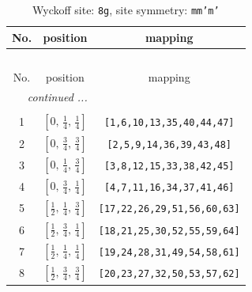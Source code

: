 \documentclass[fleqn,8pt]{jsarticle}
\begin{document}
\begin{longtable}{ccc}
\caption{Wyckoff site: {\tt 8g}, site symmetry: {\tt mm'm'}}
 \\
 \hline \hline
No. & position & mapping \\ \hline \endfirsthead

\multicolumn{2}{l}{\tablename\ \thetable{}} \\
 \hline \hline
No. & position & mapping \\ \hline \endhead

 \hline \hline
\multicolumn{2}{r}{\footnotesize\it continued ...} \\ \endfoot

 \hline \hline
\multicolumn{2}{r}{} \\ \endlastfoot

1 & $\left[ 0,\, \frac{1}{4},\, \frac{1}{4} \right]$ & {\tt [1,6,10,13,35,40,44,47]} \\ \hline
2 & $\left[ 0,\, \frac{3}{4},\, \frac{3}{4} \right]$ & {\tt [2,5,9,14,36,39,43,48]} \\ \hline
3 & $\left[ 0,\, \frac{1}{4},\, \frac{3}{4} \right]$ & {\tt [3,8,12,15,33,38,42,45]} \\ \hline
4 & $\left[ 0,\, \frac{3}{4},\, \frac{1}{4} \right]$ & {\tt [4,7,11,16,34,37,41,46]} \\ \hline
5 & $\left[ \frac{1}{2},\, \frac{1}{4},\, \frac{3}{4} \right]$ & {\tt [17,22,26,29,51,56,60,63]} \\ \hline
6 & $\left[ \frac{1}{2},\, \frac{3}{4},\, \frac{1}{4} \right]$ & {\tt [18,21,25,30,52,55,59,64]} \\ \hline
7 & $\left[ \frac{1}{2},\, \frac{1}{4},\, \frac{1}{4} \right]$ & {\tt [19,24,28,31,49,54,58,61]} \\ \hline
8 & $\left[ \frac{1}{2},\, \frac{3}{4},\, \frac{3}{4} \right]$ & {\tt [20,23,27,32,50,53,57,62]} \\
\end{longtable}
\renewcommand{\arraystretch}{1.2}
\end{document}
